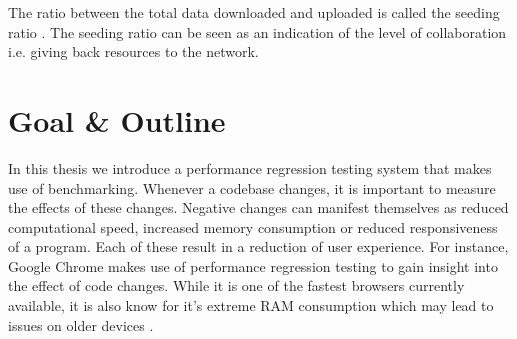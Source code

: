The ratio between the total data downloaded and uploaded is called the seeding ratio \cite{Cohen-bittorrent}.
The seeding ratio can be seen as an indication of the level of collaboration i.e. giving back resources to the network.\\




\section{Goal \& Outline}
In this thesis we introduce a performance regression testing system that makes use of benchmarking.
Whenever a codebase changes, it is important to measure the effects of these changes.
Negative changes can manifest themselves as reduced computational speed, increased memory consumption or reduced responsiveness of a program.
Each of these result in a reduction of user experience.
For instance, Google Chrome makes use of performance regression testing to gain insight into the effect of code changes.
While it is one of the fastest browsers currently available, it is also know for it's extreme RAM consumption which may lead to issues on older devices \cite{ram2012chrome}.

